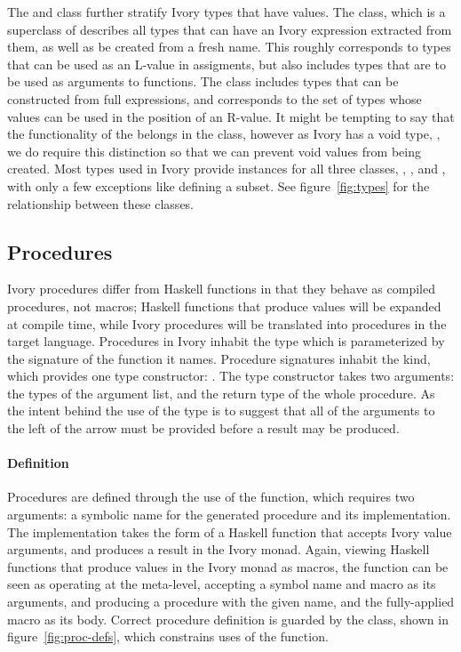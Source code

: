 The  and  class further stratify Ivory types that
have values.  The  class, which is a superclass of 
describes all types that can have an Ivory expression extracted from them, as
well as be created from a fresh name.  This roughly corresponds to types that
can be used as an L-value in assigments, but also includes types that are to be
used as arguments to functions.  The  class includes types that
can be constructed from full expressions, and corresponds to the set of types
whose values can be used in the position of an R-value.  It might be tempting to
say that the functionality of the  belongs in the 
class, however as Ivory has a void type, \cd{()}, we do require this distinction
so that we can prevent void values from being created.  Most types used in Ivory
provide instances for all three classes, , , and
, with only a few exceptions like \cd{()} defining a subset.  See
figure~\ref{fig:types} for the relationship between these classes.


\subsection{Procedures}
\label{sec:proc}

Ivory procedures differ from Haskell functions in that they behave as compiled
procedures, not macros; Haskell functions that produce  values will be
expanded at compile time, while Ivory procedures will be translated into
procedures in the target language.  Procedures in Ivory inhabit the 
type which is parameterized by the signature of the function it names.
Procedure signatures inhabit the  kind, which provides one type
constructor: \cd{:->}.  The \cd{:->} type constructor takes two arguments: the
types of the argument list, and the return type of the whole procedure.  As the
intent behind the use of the \cd{:->} type is to suggest that all of the
arguments to the left of the arrow must be provided before a result may be
produced.

\paragraph{Definition}

Procedures are defined through the use of the  function, which requires
two arguments: a symbolic name for the generated procedure and its
implementation.  The implementation takes the form of a Haskell function that
accepts Ivory value arguments, and produces a result in the Ivory monad.  Again,
viewing Haskell functions that produce values in the Ivory monad as macros, the
 function can be seen as operating at the meta-level, accepting a
symbol name and macro as its arguments, and producing a procedure with the given
name, and the fully-applied macro as its body.  Correct procedure definition is
guarded by the  class, shown in figure~\ref{fig:proc-defs},
which constrains uses of the  function.


